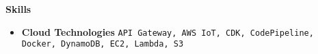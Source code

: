 \documentclass[letterpaper,12pt]{article}[leftmargin=*]
\makeatletter
\def \entryspacing {-0pt}
\renewcommand{\section}[2]{\vspace{5pt}
  \colorbox{secondary}{\color{white}\raggedbottom\normalsize\textbf{{#1}{\hspace{7pt}#2}}}
}
\newcommand{\resumeEntryStart}{\begin{itemize}[leftmargin=2.5mm]}
\newcommand{\resumeEntryEnd}{\end{itemize}\vspace{\entryspacing}}
\def\code#1{\texttt{#1}}
\newcommand{\resumeItemListStart}{\begin{itemize}[leftmargin=4.5mm]}
\newcommand{\resumeItemListEnd}{\end{itemize}}
\newcommand{\resumeItem}[1]{
  \item\small{
    {#1 \vspace{-2pt}}
  }
}
\newcommand{\resumeEntryTD}[2]{
  \vspace{-1pt}\item[]
    \begin{tabularx}{0.97\textwidth}{X@{\hspace{60pt}}r}
      \textbf{\color{primary}#1} & {\firabook\color{accent}\small#2} \\
    \end{tabularx}\vspace{-6pt}
}
\newcommand{\resumeEntryS}[2]{
  \item[]\small{
    \textbf{\color{primary}#1 }{ #2 \vspace{-6pt}}
  }
}
\makeatother
\begin{document}

\section{\faChessKnight}{Skills}
 \resumeEntryStart
  \resumeEntryS{Cloud Technologies } {\code{API Gateway, AWS IoT, CDK, CodePipeline, Docker, DynamoDB, EC2, Lambda, S3}}
 \resumeEntryEnd
\end{document}
